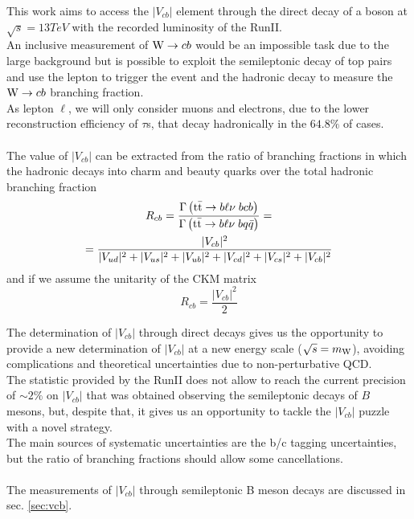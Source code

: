 \label{sec:AN}
\minitoc

This work aims to access the $|V_{cb}|$ element through the direct decay of a \PW boson at $\sqrt{s}=13 TeV$ with the recorded luminosity of the RunII.\\
An inclusive measurement of ${\text{W}} \to cb$ would be an impossible task due to the large background but is possible to exploit the semileptonic decay of top pairs and use the lepton to trigger the event and the hadronic \PW decay to measure the ${\text{W}} \to cb$ branching fraction.\\
As lepton $\ell$, we will only consider muons and electrons, due to the lower reconstruction efficiency of $\tau$s, that decay hadronically in the $64.8\%$ of cases.
\\
\\
The value of $|V_{cb}|$ can be extracted from the ratio of branching fractions in which the hadronic \PW decays into charm and beauty quarks over the total \PW hadronic branching fraction
\begin{equation}
\begin{gathered}
    R_{cb}=\frac{\Gamma\left({{\text{t}}{\bar{\text{t}}}} \to b\ell \nu\; b cb\right)}{\Gamma\left({{\text{t}}{\bar{\text{t}}}} \to b\ell \nu\; b q\bar{q}\right)}=\\ =\frac{|V_{cb}|^2}{|V_{ud}|^2+|V_{us}|^2+|V_{ub}|^2+|V_{cd}|^2+|V_{cs}|^2+|V_{cb}|^2}
\end{gathered}
\end{equation}
and if we assume the unitarity of the CKM matrix
\begin{equation}
    R_{cb}=\frac{|V_{cb}|^2}{2}
\end{equation}

The determination of $|V_{cb}|$ through direct \PW decays gives us the opportunity to provide a new determination of $|V_{cb}|$ at a new energy scale ($\sqrt{s}=m_{{\text{W}}}$), avoiding complications and theoretical uncertainties due to non-perturbative QCD.\\
The statistic provided by the RunII does not allow to reach the current precision of $\sim2 \%$ on $|V_{cb}|$ that was obtained observing the semileptonic decays of $B$ mesons, but, despite that, it gives us an opportunity to tackle the $|V_{cb}|$ puzzle with a novel strategy.\\
The main sources of systematic uncertainties are the b/c tagging uncertainties, but the ratio of branching fractions should allow some cancellations.\\
\\
The measurements of $|V_{cb}|$ through semileptonic B meson decays are discussed in sec. \ref{sec:vcb}.


